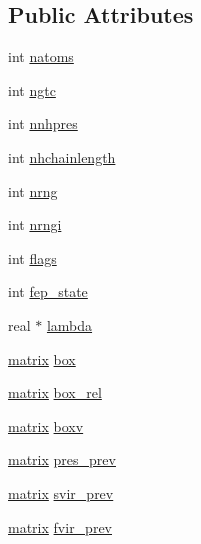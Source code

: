 \subsection*{\-Public \-Attributes}
\begin{DoxyCompactItemize}
\item 
int \hyperlink{structt__state_afaea6d8bb8e44337f8ed824cfc2f70ed}{natoms}
\item 
int \hyperlink{structt__state_ade0c0efd154b1336530f2f049782f12b}{ngtc}
\item 
int \hyperlink{structt__state_a554d8189a9b63e016efb91957509e623}{nnhpres}
\item 
int \hyperlink{structt__state_a62aa2af58d908ef31d7c2cccfb481ee1}{nhchainlength}
\item 
int \hyperlink{structt__state_a68e0cf7bd91ec1fb91f2639b3eb4433d}{nrng}
\item 
int \hyperlink{structt__state_ae0dbac1fc72361b37fff30fdbecd7603}{nrngi}
\item 
int \hyperlink{structt__state_af6dbefabe2e05a38b55e74ad22d62840}{flags}
\item 
int \hyperlink{structt__state_a1a50c4a421790dc5a2bec971c4fccca4}{fep\-\_\-state}
\item 
real $\ast$ \hyperlink{structt__state_a2149b3f76a31cd0ada04424697606098}{lambda}
\item 
\hyperlink{share_2template_2gromacs_2types_2simple_8h_a7ea9c2a830d3f743b887387e33645a83}{matrix} \hyperlink{structt__state_a5b04cfec0c5ca3e24af18174e68961e9}{box}
\item 
\hyperlink{share_2template_2gromacs_2types_2simple_8h_a7ea9c2a830d3f743b887387e33645a83}{matrix} \hyperlink{structt__state_ab96ac99d3d8fae263b05436261359502}{box\-\_\-rel}
\item 
\hyperlink{share_2template_2gromacs_2types_2simple_8h_a7ea9c2a830d3f743b887387e33645a83}{matrix} \hyperlink{structt__state_a032e2e984b1748f12db76af1e28aced5}{boxv}
\item 
\hyperlink{share_2template_2gromacs_2types_2simple_8h_a7ea9c2a830d3f743b887387e33645a83}{matrix} \hyperlink{structt__state_affdc7fa00e6e77e6f80cb7e8457e777d}{pres\-\_\-prev}
\item 
\hyperlink{share_2template_2gromacs_2types_2simple_8h_a7ea9c2a830d3f743b887387e33645a83}{matrix} \hyperlink{structt__state_ac24ed2cc01441285a84315fb0dc7771e}{svir\-\_\-prev}
\item 
\hyperlink{share_2template_2gromacs_2types_2simple_8h_a7ea9c2a830d3f743b887387e33645a83}{matrix} \hyperlink{structt__state_a5f012512aa704c9be1bcf07df903230d}{fvir\-\_\-prev}

\end{DoxyCompactItemize}

